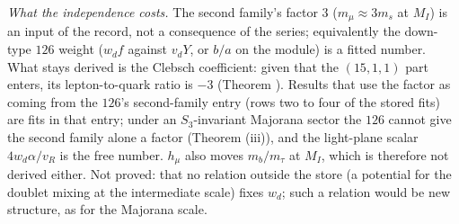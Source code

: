 \emph{What the independence costs.} The second family's factor $3$ ($m_{\mu} \approx 3m_{s}$ at $M_{I}$) is an input of the record, not a consequence of the series; equivalently the down-type $126$ weight ($w_{d}f$ against $v_{d}Y$, or $b/a$ on the module) is a fitted number. What stays derived is the Clebsch coefficient: given that the $(15,1,1)$ part enters, its lepton-to-quark ratio is $-3$ (Theorem ). Results that use the factor as coming from the $126$'s second-family entry (rows two to four of the stored fits) are fits in that entry; under an $S_{3}$-invariant Majorana sector the $126$ cannot give the second family alone a factor (Theorem (iii)), and the light-plane scalar $4w_{d}\alpha/v_{R}$ is the free number. $h_{\mu}$ also moves $m_{b}/m_{\tau}$ at $M_{I}$, which is therefore not derived either. Not proved: that no relation outside the store (a potential for the doublet mixing at the intermediate scale) fixes $w_{d}$; such a relation would be new structure, as for the Majorana scale.
